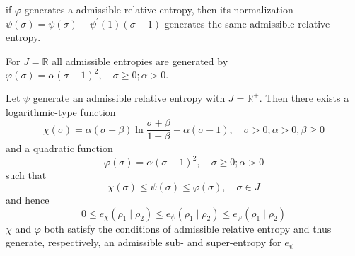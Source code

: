 if \(\varphi\) generates a admissible relative entropy, then its normalization $\tilde{\psi}(\sigma)=\psi(\sigma)-\psi^{\prime}(1)(\sigma-1)$ generates the same admissible relative entropy.

\begin{lemma}\label{entropy_on_R}
	For $J=\mathbb{R}$ all admissible entropies are generated by $\varphi(\sigma)=\alpha(\sigma-1)^{2}, \quad \sigma \geq 0 ; \alpha>0 .$
\end{lemma}

\begin{lemma}
 Let $\psi$ generate an admissible relative entropy with $J=\mathbb{R}^{+} .$ Then there exists a logarithmic-type function 
 \begin{equation}\label{logarithmic-type-entropy-generator}
 \chi(\sigma)=\alpha(\sigma+\beta) \ln \frac{\sigma+\beta}{1+\beta}-\alpha(\sigma-1), \quad \sigma>0 ; \alpha>0, \beta \geq 0\end{equation}
  and a quadratic function
  \begin{equation}\varphi(\sigma)=\alpha(\sigma-1)^{2}, \quad \sigma \geq 0 ; \alpha>0\end{equation}
   such that
$$
\chi(\sigma) \leq \psi(\sigma) \leq \varphi(\sigma), \quad \sigma \in J
$$
and hence
$$
0 \leq e_{\chi}\left(\rho_{1} \mid \rho_{2}\right) \leq e_{\psi}\left(\rho_{1} \mid \rho_{2}\right) \leq e_{\varphi}\left(\rho_{1} \mid \rho_{2}\right)
$$
\(\chi\) and $\varphi$ both satisfy the conditions of admissible relative entropy and thus generate, respectively, an admissible sub- and super-entropy for $e_{\psi}$	
\end{lemma}

